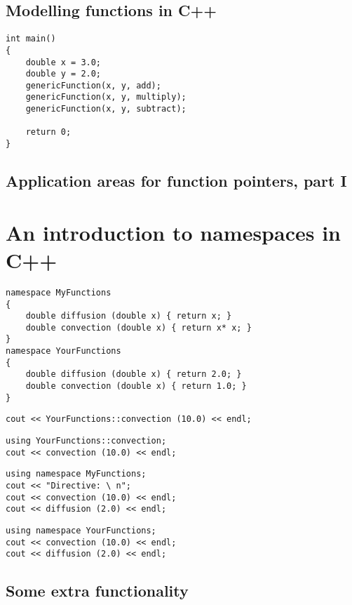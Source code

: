 \subsection{Modelling functions in C++}

\begin{lstlisting}
int main()
{
	double x = 3.0;
	double y = 2.0;
	genericFunction(x, y, add);
	genericFunction(x, y, multiply);
	genericFunction(x, y, subtract);

	return 0;
}
\end{lstlisting}

\subsection{Application areas for function pointers, part I}

\section{An introduction to namespaces in C++}

\begin{lstlisting}
namespace MyFunctions
{
	double diffusion (double x) { return x; }
	double convection (double x) { return x* x; }
}
namespace YourFunctions
{
	double diffusion (double x) { return 2.0; }
	double convection (double x) { return 1.0; }
}
\end{lstlisting}

\begin{lstlisting}
cout << YourFunctions::convection (10.0) << endl;
\end{lstlisting}

\begin{lstlisting}
using YourFunctions::convection;
cout << convection (10.0) << endl;
\end{lstlisting}

\begin{lstlisting}
using namespace MyFunctions;
cout << "Directive: \ n";
cout << convection (10.0) << endl;
cout << diffusion (2.0) << endl;
\end{lstlisting}

\begin{lstlisting}
using namespace YourFunctions;
cout << convection (10.0) << endl;
cout << diffusion (2.0) << endl;
\end{lstlisting}

\subsection{Some extra functionality}

